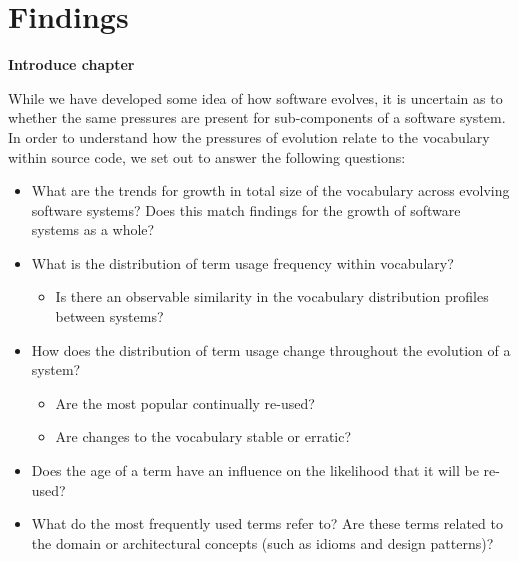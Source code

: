\chapter{Findings} %
\label{cha:findings}

\textbf{Introduce chapter}

While we have developed some idea of how software evolves, it is uncertain as to whether the same pressures are present for sub-components of a software system. In order to understand how the pressures of evolution relate to the vocabulary within source code, we set out to answer the following questions:


% 	
% 	
% 	
% 	

\begin{itemize}
	\item What are the trends for growth in total size of the vocabulary across evolving software systems? Does this match findings for the growth of software systems as a whole?
	\item What is the distribution of term usage frequency within vocabulary?
		\begin{itemize}
			\item Is there an observable similarity in the vocabulary distribution profiles between systems?
		\end{itemize}
	\item How does the distribution of term usage change throughout the evolution of a system?
		\begin{itemize}
			\item Are the most popular continually re-used?
			\item Are changes to the vocabulary stable or erratic?
		\end{itemize}
	\item Does the age of a term have an influence on the likelihood that it will be re-used?
	\item What do the most frequently used terms refer to? Are these terms related to the domain or architectural concepts (such as idioms and design patterns)?
\end{itemize}

